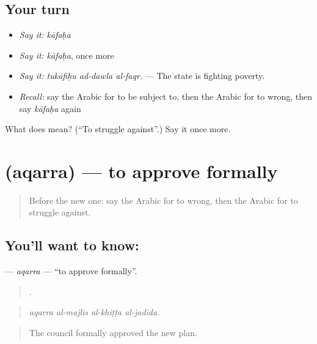 \subsection*{Your turn}
\begin{itemize}
\raggedright
  \item \emph{Say it:} \emph{kāfaḥa}
  \item \emph{Say it:} \emph{kāfaḥa}, once more
  \item \emph{Say it:} \emph{tukāfiḥu ad-dawla al-faqr.} — The state is fighting poverty.
  \item \emph{Recall:} say the Arabic for to be subject to, then the Arabic for to wrong, then say \emph{kāfaḥa} again
\end{itemize}

\begin{tcolorbox}[breakable,colback=teal!4,colframe=teal!35!black,title={Before you move on}]
What does  mean? (\textquotedblleft{}To struggle against\textquotedblright{}.) Say it once more.
\end{tcolorbox}
\section[\texorpdfstring{\ar{أقر} (aqarra)}{أقر (aqarra)}]{ (aqarra) — to approve formally}

\label{lesson:AR-C411-aqarra}



\begin{quote}
Before the new one: say the Arabic for to wrong, then the Arabic for to struggle against.
\end{quote}

\subsection*{You'll want to know: }
\textbf{} — \emph{aqarra} — \textquotedblleft{}to approve formally\textquotedblright{}.

\begin{quote}
   .
\end{quote}

\begin{quote}
\emph{aqarra al-majlis al-khiṭṭa al-jadīda.}
\end{quote}

\begin{quote}
The council formally approved the new plan.
\end{quote}


